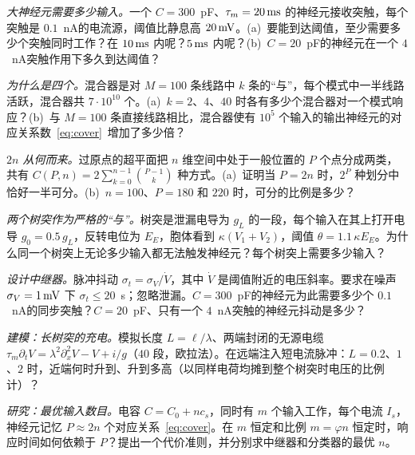 \begin{exercise}[\lvlA]
\label{ex:19:1}
\emph{大神经元需要多少输入。}一个 $C=300$~pF、$\tau_m=20\,\text{ms}$ 的神经元接收突触，每个突触是 $0.1$~nA的电流源，阈值比静息高 $20\,\text{mV}$。(a)~要能到达阈值，至少需要多少个突触同时工作？在 $10\,\text{ms}$ 内呢？$5\,\text{ms}$ 内呢？(b)~$C=20$~pF的神经元在一个 $4$~nA突触作用下多久到达阈值？
\end{exercise}

\begin{exercise}[\lvlA]
\label{ex:19:2}
\emph{为什么是四个。}混合器是对 $M=100$ 条线路中 $k$ 条的“与”，每个模式中一半线路活跃，混合器共 $7\cdot10^{10}$ 个。(a)~$k=2$、$4$、$40$ 时各有多少个混合器对一个模式响应？(b)~与 $M=100$ 条直接线路相比，混合器使有 $10^5$ 个输入的输出神经元的对应关系数~\eqref{eq:cover}~增加了多少倍？
\end{exercise}

\begin{exercise}[\lvlB]
\label{ex:19:3}
\emph{$2n$ 从何而来。}过原点的超平面把 $n$ 维空间中处于一般位置的 $P$ 个点分成两类，共有 $C(P,n)=2\sum_{k=0}^{n-1}\binom{P-1}{k}$ 种方式。(a)~证明当 $P=2n$ 时，$2^P$ 种划分中恰好一半可分。(b)~$n=100$、$P=180$ 和 $220$ 时，可分的比例是多少？
\end{exercise}

\begin{exercise}[\lvlB]
\label{ex:19:4}
\emph{两个树突作为严格的“与”。}树突是泄漏电导为 $g_L$ 的一段，每个输入在其上打开电导 $g_0=0.5\,g_L$，反转电位为 $E_E$，胞体看到 $\kappa(V_1+V_2)$，阈值 $\theta=1.1\,\kappa E_E$。为什么同一个树突上无论多少输入都无法触发神经元？每个树突上需要多少输入？
\end{exercise}

\begin{exercise}[\lvlB]
\label{ex:19:5}
\emph{设计中继器。}脉冲抖动 $\sigma_t=\sigma_V/\dot V$，其中 $\dot V$ 是阈值附近的电压斜率。要求在噪声 $\sigma_V=1\,\text{mV}$ 下 $\sigma_t\le20$~\textmu s；忽略泄漏。$C=300$~pF的神经元为此需要多少个 $0.1$~nA的同步突触？$C=20$~pF、只有一个 $4$~nA突触的神经元抖动是多少？
\end{exercise}

\begin{exercise}[\lvlB]
\label{ex:19:6}
\emph{建模：长树突的充电。}模拟长度 $L=\ell/\lambda$、两端封闭的无源电缆 $\tau_m\partial_tV=\lambda^2\partial_x^2V-V+i/g$（$40$ 段，欧拉法）。在远端注入短电流脉冲：$L=0.2$、$1$、$2$ 时，近端何时升到、升到多高（以同样电荷均摊到整个树突时电压的比例计）？
\end{exercise}

\begin{exercise}[\lvlC]
\label{ex:19:7}
\emph{研究：最优输入数目。}电容 $C=C_0+nc_s$，同时有 $m$ 个输入工作，每个电流 $I_s$，神经元记忆 $P\approx2n$ 个对应关系~\eqref{eq:cover}。在 $m$ 恒定和比例 $m=\varphi n$ 恒定时，响应时间如何依赖于 $P$？提出一个代价准则，并分别求中继器和分类器的最优 $n$。
\end{exercise}
